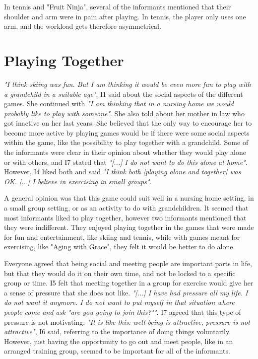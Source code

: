 In tennis and "Fruit Ninja", several of the informants mentioned that their shoulder and arm were in pain after playing. In tennis, the player only uses one arm, and the workload gets therefore asymmetrical.  
    
\section{Playing Together}
\emph{"I think skiing was fun. But I am thinking it would be even more fun to play with a grandchild in a suitable age"}, I1 said about the social aspects of the different games. She continued with \emph{"I am thinking that in a nursing home we would probably like to play with someone"}. She also told about her mother in law who got inactive on her last years. She believed that the only way to encourage her to become more active by playing games would be if there were some social aspects within the game, like the possibility to play together with a grandchild. Some of the informants were clear in their opinion about whether they would play alone or with others, and I7 stated that \emph{"[...] I do not want to do this alone at home"}. However, I4 liked both and said \emph{"I think both [playing alone and together] was OK. [...] I believe in  exercising in small groups"}.

A general opinion was that this game could suit well in a nursing home setting, in a small group setting, or as an activity to do with grandchildren. It seemed that most informants liked to play together, however two informants mentioned that they were indifferent. They enjoyed playing together in the games that were made for fun and entertainment, like skiing and tennis, while with games meant for exercising, like "Aging with Grace", they felt it would be better to do alone.  

Everyone agreed that being social and meeting people are important parts in life, but that they would do it on their own time, and not be locked to a specific group or time. I5 felt that meeting together in a group for exercise would give her a sense of pressure that she does not like. \emph{"[...] I have had pressure all my life. I do not want it anymore. I do not want to put myself in that situation where people come and ask "are you going to join this?""}. I7 agreed that this type of pressure is not motivating. \emph{"It is like this: well-being is attractive, pressure is not attractive"}, I6 said, referring to the importance of doing things voluntarily. However, just having the opportunity to go out and meet people, like in an arranged training group, seemed to be important for all of the informants. 

